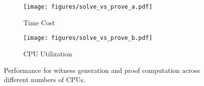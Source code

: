 


\begin{figure}[t]
    \centering
    \begin{subfigure}[b]{0.22\textwidth}
        \centering
        \texttt{[image: figures/solve\_vs\_prove\_a.pdf]}
        \captionsetup{justification=centering}  %
        \caption{Time Cost}
        \label{fig:solve_vs_prove_a}
    \end{subfigure}
        \hspace{0.01\textwidth}
    \begin{subfigure}[b]{0.22\textwidth}
        \centering
        \texttt{[image: figures/solve\_vs\_prove\_b.pdf]}
        \captionsetup{justification=centering}  %
        \caption{CPU Utilization}
        \label{fig:solve_vs_prove_b}
    \end{subfigure}
    \caption{Performance for witness generation and proof computation across different numbers of CPUs. }
    \label{fig:solve_vs_prove}
\end{figure}


